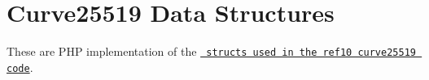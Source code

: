 \chapter{Curve25519 Data Structures}
\hypertarget{md_public_2glpi_2vendor_2paragonie_2sodium__compat_2src_2_core32_2_curve25519_2_r_e_a_d_m_e}{}\label{md_public_2glpi_2vendor_2paragonie_2sodium__compat_2src_2_core32_2_curve25519_2_r_e_a_d_m_e}
\label{md_public_2glpi_2vendor_2paragonie_2sodium__compat_2src_2_core32_2_curve25519_2_r_e_a_d_m_e_autotoc_md6891}%
%
 These are PHP implementation of the \href{https://github.com/jedisct1/libsodium/blob/master/src/libsodium/include/sodium/private/curve25519_ref10.h}{\texttt{ structs used in the ref10 curve25519 code}}. 